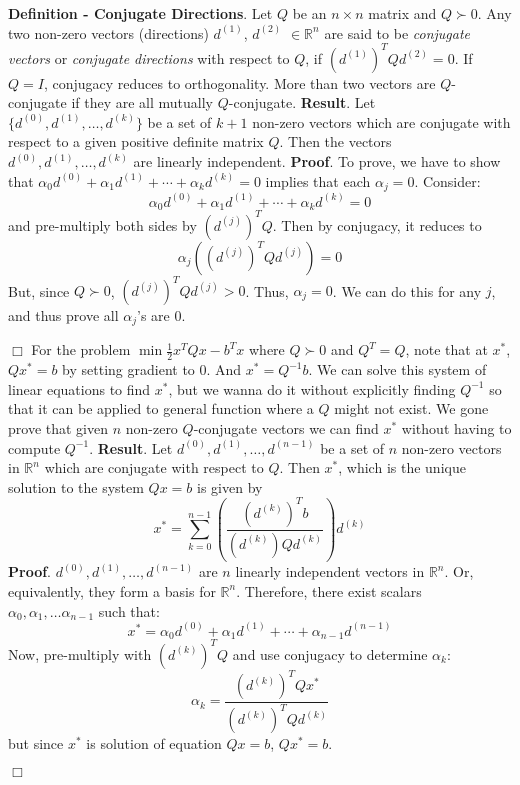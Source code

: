 \documentclass[11pt]{article}
\title{}
\begin{document}
\noindent \textbf{Definition - Conjugate Directions}. Let $Q$ be an $n\times n$
matrix and $Q\succ 0$. Any two non-zero vectors (directions) $d^{(1)}$, $d^{(2)}$
$\in\mathbb{R}^n$ are said to be \textit{conjugate vectors} or \textit{conjugate
directions} with respect to $Q$, if $(d^{(1)})^TQd^{(2)}=0$.
\vskip0.5cm\noindent If $Q=I$, conjugacy reduces to orthogonality. More than two vectors
are $Q$-conjugate if they are all mutually $Q$-conjugate.
\vskip0.5cm\noindent \textbf{Result}. Let $\{d^{(0)},d^{(1)},\dotsc,d^{(k)}\}$ be a set
of $k+1$ non-zero vectors which are conjugate with respect to a given positive
definite matrix $Q$. Then the vectors $d^{(0)},d^{(1)},\dotsc,d^{(k)}$ are linearly
independent.
\vskip0.5cm\noindent \textbf{Proof}. To prove, we have to show that
$\alpha_0d^{(0)}+\alpha_1d^{(1)}+\cdots+\alpha_kd^{(k)}=0$ implies that each
$\alpha_j=0$.
Consider:
\[\alpha_0d^{(0)}+\alpha_1d^{(1)}+\cdots+\alpha_kd^{(k)}=0\]
and pre-multiply both sides by $(d^{(j)})^TQ$. Then by conjugacy, it reduces to
\[\alpha_j((d^{(j)})^TQd^{(j)})=0\]
But, since $Q\succ 0$, $(d^{(j)})^TQd^{(j)}>0$. Thus, $\alpha_j=0$. We can do this
for any $j$, and thus prove all $\alpha_j$'s are 0.
\par\hfill$\Box$
\vskip0.5cm For the problem $\min\frac{1}{2}x^TQx-b^Tx$ where $Q\succ 0$ and
$Q^T=Q$, note that at $x^*$, $Qx^*=b$ by setting gradient to 0. And $x^*=Q^{-1}b$.
We can solve this system of linear equations to find $x^*$, but we wanna do it without
explicitly finding $Q^{-1}$ so that it can be applied to general function where
a $Q$ might not exist. We gone prove that given $n$ non-zero $Q$-conjugate vectors
we can find $x^*$ without having to compute $Q^{-1}$.
\vskip0.5cm \noindent \textbf{Result}. Let $d^{(0)},d^{(1)},\dotsc,d^{(n-1)}$ be
a set of $n$ non-zero vectors in $\mathbb{R}^n$ which are conjugate with respect
to $Q$. Then $x^*$, which is the unique solution to the system $Qx=b$ is given by
\[x^*=\sum_{k=0}^{n-1}\left(\dfrac{(d^{(k)})^Tb} {(d^{(k)})Qd^{(k)}} \right)d^{(k)}\]
%
\vskip0.5cm\noindent\textbf{Proof}. $d^{(0)},d^{(1)},\dotsc,d^{(n-1)}$ are
$n$ linearly independent vectors in $\mathbb{R}^n$. \break Or, equivalently, they form
a basis for $\mathbb{R}^n$. Therefore, there exist scalars $\alpha_0,\alpha_1,
\dotsc\alpha_{n-1}$ such that:
\[x^*=\alpha_0d^{(0)}+\alpha_1d^{(1)}+\cdots+\alpha_{n-1}d^{(n-1)}\]
Now, pre-multiply with $(d^{(k)})^TQ$ and use conjugacy to determine $\alpha_k$:
\[\alpha_k=\dfrac{(d^{(k)})^TQx^*}{(d^{(k)})^TQd^{(k)}}\]
but since $x^*$ is solution of equation $Qx=b$, $Qx^*=b$.
\par\hfill$\Box$
\end{document}

